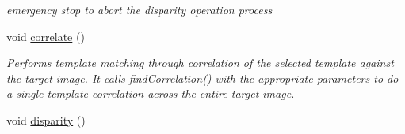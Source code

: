 \begin{DoxyCompactItemize}
\begin{DoxyCompactList}\small\item\em emergency stop to abort the disparity operation process \item\end{DoxyCompactList}\item 
\hypertarget{classQcorr_ace91b9d83b34887735737323bac5431e}{
void \hyperlink{classQcorr_ace91b9d83b34887735737323bac5431e}{correlate} ()}
\label{classQcorr_ace91b9d83b34887735737323bac5431e}

\begin{DoxyCompactList}\small\item\em Performs template matching through correlation of the selected template against the target image. It calls findCorrelation() with the appropriate parameters to do a single template correlation across the entire target image. \item\end{DoxyCompactList}\item 
\hypertarget{classQcorr_a640ee4c76350e5886deddbf4f0d50594}{
void \hyperlink{classQcorr_a640ee4c76350e5886deddbf4f0d50594}{disparity} ()}
\label{classQcorr_a640ee4c76350e5886deddbf4f0d50594}


\end{DoxyCompactItemize}
